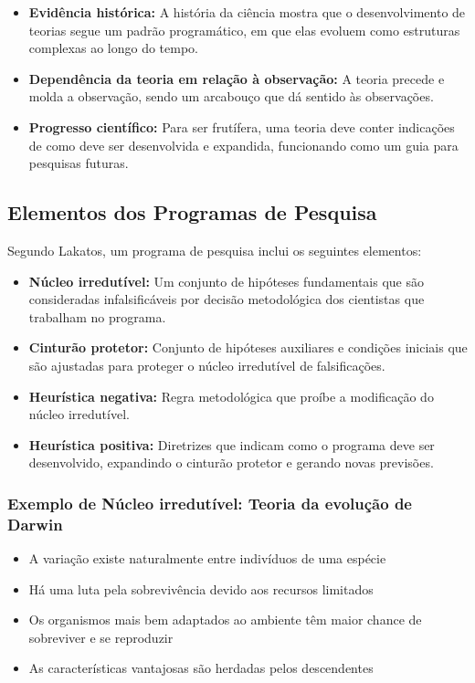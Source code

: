 \documentclass{article} %
\begin{document}
\begin{itemize}
    \item \textbf{Evidência histórica:} A história da ciência mostra que o desenvolvimento de teorias segue um padrão programático, em que elas evoluem como estruturas complexas ao longo do tempo.
    
    \item \textbf{Dependência da teoria em relação à observação:} A teoria precede e molda a observação, sendo um arcabouço que dá sentido às observações.
    
    \item \textbf{Progresso científico:} Para ser frutífera, uma teoria deve conter indicações de como deve ser desenvolvida e expandida, funcionando como um guia para pesquisas futuras.
\end{itemize}

\subsection{Elementos dos Programas de Pesquisa}

Segundo Lakatos, um programa de pesquisa inclui os seguintes elementos:

\begin{itemize}
    \item \textbf{Núcleo irredutível:} Um conjunto de hipóteses fundamentais que são consideradas infalsificáveis por decisão metodológica dos cientistas que trabalham no programa.
    
    \item \textbf{Cinturão protetor:} Conjunto de hipóteses auxiliares e condições iniciais que são ajustadas para proteger o núcleo irredutível de falsificações.
    
    \item \textbf{Heurística negativa:} Regra metodológica que proíbe a modificação do núcleo irredutível.
    
    \item \textbf{Heurística positiva:} Diretrizes que indicam como o programa deve ser desenvolvido, expandindo o cinturão protetor e gerando novas previsões.
\end{itemize}

\subsubsection{Exemplo de Núcleo irredutível: Teoria da evolução de Darwin}
\begin{itemize}
\item A variação existe naturalmente entre indivíduos de uma espécie
\item Há uma luta pela sobrevivência devido aos recursos limitados
\item Os organismos mais bem adaptados ao ambiente têm maior chance de sobreviver e se reproduzir
\item As características vantajosas são herdadas pelos descendentes
\end{itemize}
\end{document}
